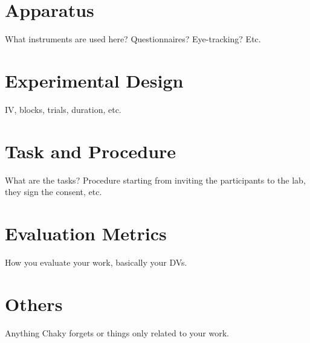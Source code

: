 \section{Apparatus}
What instruments are used here?  Questionnaires?  Eye-tracking? Etc.

\section{Experimental Design}
IV, blocks, trials, duration, etc.

\section{Task and Procedure}
What are the tasks?  Procedure starting from inviting the participants to the lab,  they sign the consent, etc.

\section{Evaluation Metrics}
How you evaluate your work,  basically your DVs.

\section{Others}
Anything Chaky forgets or things only related to your work.
